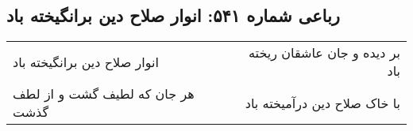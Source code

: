 \begin{center}
\section*{رباعی شماره ۵۴۱: انوار صلاح دین برانگیخته باد}
\label{sec:0541}
\begin{longtable}{l p{0.5cm} r}
انوار صلاح دین برانگیخته باد
&&
بر دیده و جان عاشقان ریخته باد
\\
هر جان که لطیف گشت و از لطف گذشت
&&
با خاک صلاح دین درآمیخته باد
\\
\end{longtable}
\end{center}
